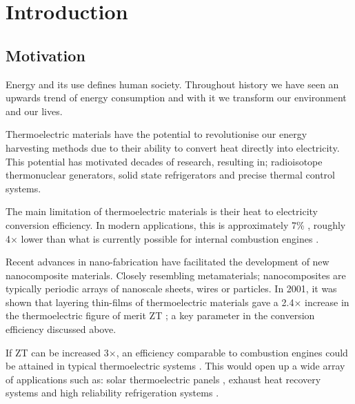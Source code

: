 \documentclass[12pt,draft]{article}
\begin{document}
\pagebreak

\tableofcontents

\pagebreak


\pagestyle{fancy}

\section{Introduction}
 
\subsection{Motivation}
Energy and its use defines human society. Throughout history we have seen an upwards trend of energy consumption and with it we transform our environment and our lives.

Thermoelectric materials have the potential to revolutionise our energy harvesting methods due to their ability to convert heat directly into electricity. This potential has motivated decades of research, resulting in; radioisotope thermonuclear generators, solid state refrigerators and precise thermal control systems.

The main limitation of thermoelectric materials is their heat to electricity conversion efficiency. In modern applications, this is approximately 7\% \cite{modern-thermoelectrics}, roughly 4$\times$ lower than what is currently possible for internal combustion engines \cite{engine-efficiency}.

Recent advances in nano-fabrication have facilitated the development of new nanocomposite materials. Closely resembling metamaterials; nanocomposites are typically periodic arrays of nanoscale sheets, wires or particles. In 2001, it was shown that layering thin-films of thermoelectric materials gave a 2.4$\times$ increase in the thermoelectric figure of merit ZT \cite{nanocomposite-zt}; a key parameter in the conversion efficiency discussed above.

If ZT can be increased 3$\times$, an efficiency comparable to combustion engines could be attained in typical thermoelectric systems \cite{liu-review}. This would open up a wide array of applications such as: solar thermoelectric panels \cite{solar-thermal}, exhaust heat recovery systems \cite{exhust-recovery} and high reliability refrigeration systems \cite{thermo-cooling}.
\end{document}
